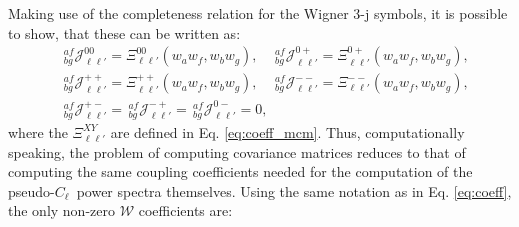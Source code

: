 \documentclass[a4paper,11pt]{article}
\newcommand{\PCL}{pseudo-$C_\ell$~}
\begin{document}
        Making use of the completeness relation for the Wigner 3-j symbols, it is possible to show, that these can be written as:
        \begin{align}
          &\,^{af}_{bg}\mathcal{J}^{00}_{\ell\ell'}=\Xi^{00}_{\ell\ell'}(w_aw_f,w_bw_g),\hspace{12pt}
           \,^{af}_{bg}\mathcal{J}^{0+}_{\ell\ell'}=\Xi^{0+}_{\ell\ell'}(w_aw_f,w_bw_g),\\
          &\,^{af}_{bg}\mathcal{J}^{++}_{\ell\ell'}=\Xi^{++}_{\ell\ell'}(w_aw_f,w_bw_g),\hspace{12pt}
           \,^{af}_{bg}\mathcal{J}^{--}_{\ell\ell'}=\Xi^{--}_{\ell\ell'}(w_aw_f,w_bw_g),\\
          &\,^{af}_{bg}\mathcal{J}^{+-}_{\ell\ell'}=
           \,^{af}_{bg}\mathcal{J}^{-+}_{\ell\ell'}=
           \,^{af}_{bg}\mathcal{J}^{0-}_{\ell\ell'}=0,
        \end{align}
        where the $\Xi^{XY}_{\ell\ell'}$ are defined in Eq. \ref{eq:coeff_mcm}.
        Thus, computationally speaking, the problem of computing covariance matrices reduces to that of computing the same coupling coefficients needed for the computation of the \PCL power spectra themselves. Using the same notation as in Eq. \ref{eq:coeff}, the only non-zero $\mathcal{W}$ coefficients are:
\end{document}
